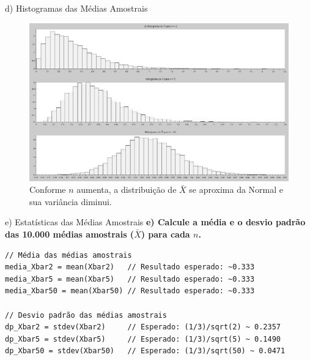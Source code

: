 \begin{frame}{d) Histogramas das Médias Amostrais}
    \begin{figure}
        \includegraphics[width=0.80\linewidth]{figures/grafico2_hist_medias.jpg}
        \caption*{Conforme $n$ aumenta, a distribuição de $\bar{X}$ se aproxima da Normal e sua variância diminui.}
    \end{figure}
\end{frame}

\begin{frame}[fragile]{e) Estatísticas das Médias Amostrais}
    \textbf{e) Calcule a média e o desvio padrão das 10.000 médias amostrais ($\bar{X}$) para cada $n$.}

\begin{lstlisting}
// Média das médias amostrais
media_Xbar2 = mean(Xbar2)   // Resultado esperado: ~0.333
media_Xbar5 = mean(Xbar5)   // Resultado esperado: ~0.333
media_Xbar50 = mean(Xbar50) // Resultado esperado: ~0.333

// Desvio padrão das médias amostrais
dp_Xbar2 = stdev(Xbar2)     // Esperado: (1/3)/sqrt(2) ~ 0.2357
dp_Xbar5 = stdev(Xbar5)     // Esperado: (1/3)/sqrt(5) ~ 0.1490
dp_Xbar50 = stdev(Xbar50)   // Esperado: (1/3)/sqrt(50) ~ 0.0471
\end{lstlisting}
\end{frame}

